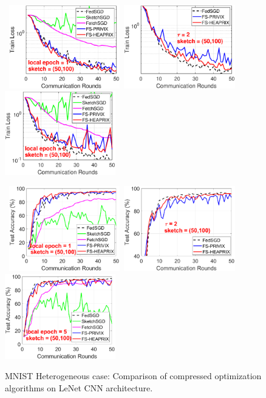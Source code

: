 \documentclass[11pt]{article}
\begin{document}
\begin{figure}[h]
\begin{center}
		\mbox{%
		\includegraphics[width=1.9in]{MNIST_figures/local1_sketch50_iid0_train_loss.eps}%
		\includegraphics[width=1.9in]{MNIST_figures/local2_sketch50_iid0_train_loss.eps}%
		\includegraphics[width=1.9in]{MNIST_figures/local5_sketch50_iid0_train_loss.eps}}
		
		\mbox{%
		\includegraphics[width=1.9in]{MNIST_figures/local1_sketch50_iid0_test_acc.eps}%
		\includegraphics[width=1.9in]{MNIST_figures/local2_sketch50_iid0_test_acc.eps} %
		\includegraphics[width=1.9in]{MNIST_figures/local5_sketch50_iid0_test_acc.eps}
		}
	\end{center}
	\caption{MNIST Heterogeneous case: Comparison of compressed optimization algorithms on LeNet CNN architecture.}
    \label{fig:MNIST-iid0-app}
\end{figure}
\end{document}
